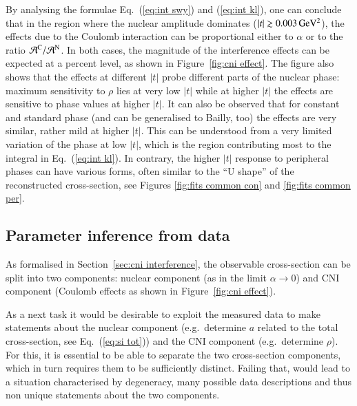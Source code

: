 By analysing the formulae Eq.~(\ref{eq:int swy}) and (\ref{eq:int kl}), one can conclude that in the region where the nuclear amplitude dominates ($|t| \gtrsim 0.003\,{\rm GeV^2}$), the effects due to the Coulomb interaction can be proportional either to $\alpha$ or to the ratio ${\cal A}^{\rm C} / {\cal A}^{\rm N}$. In both cases, the magnitude of the interference effects can be expected at a percent level, as shown in Figure~\ref{fig:cni effect}. The figure also shows that the effects at different $|t|$ probe different parts of the nuclear phase: maximum sensitivity to $\rho$ lies at very low $|t|$ while at higher $|t|$ the effects are sensitive to phase values at higher $|t|$. It can also be observed that for constant and standard phase (and can be generalised to Bailly, too) the effects are very similar, rather mild at higher $|t|$. This can be understood from a very limited variation of the phase at low $|t|$, which is the region contributing most to the integral in Eq.~(\ref{eq:int kl}). In contrary, the higher $|t|$ response to peripheral phases can have various forms, often similar to the ``U shape'' of the reconstructed cross-section, see Figures \ref{fig:fits common con} and \ref{fig:fits common per}.




\subsection{Parameter inference from data}
\label{sec:cni task discussion}

As formalised in Section~\ref{sec:cni interference}, the observable cross-section can be split into two components: nuclear component (as in the limit $\alpha\to 0$) and CNI component (Coulomb effects as shown in Figure~\ref{fig:cni effect}).

As a next task it would be desirable to exploit the measured data to make statements about the nuclear component (e.g.~determine $a$ related to the total cross-section, see Eq.~(\ref{eq:si tot})) and the CNI component (e.g.~determine $\rho$). For this, it is essential to be able to separate the two cross-section components, which in turn requires them to be sufficiently distinct. Failing that, would lead to a situation characterised by degeneracy, many possible data descriptions and thus non unique statements about the two components.

